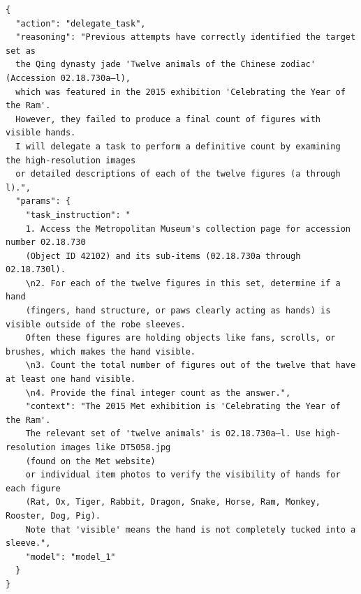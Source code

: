 \begin{tcolorbox}[
  title={\textbf{\small Attempt 5 - Main Decision}},
  boxrule=1pt,
  arc=0mm,
  colback=gray!5,
  colframe=gray!70,
  breakable,
  before skip=10pt,
  after skip=10pt,
  pad at break=2mm,
  parbox=false
]
\begin{verbatim}
{
  "action": "delegate_task",
  "reasoning": "Previous attempts have correctly identified the target set as 
  the Qing dynasty jade 'Twelve animals of the Chinese zodiac' (Accession 02.18.730a–l), 
  which was featured in the 2015 exhibition 'Celebrating the Year of the Ram'. 
  However, they failed to produce a final count of figures with visible hands. 
  I will delegate a task to perform a definitive count by examining the high-resolution images 
  or detailed descriptions of each of the twelve figures (a through l).",
  "params": {
    "task_instruction": "
    1. Access the Metropolitan Museum's collection page for accession number 02.18.730 
    (Object ID 42102) and its sub-items (02.18.730a through 02.18.730l).
    \n2. For each of the twelve figures in this set, determine if a hand 
    (fingers, hand structure, or paws clearly acting as hands) is visible outside of the robe sleeves.
    Often these figures are holding objects like fans, scrolls, or brushes, which makes the hand visible.
    \n3. Count the total number of figures out of the twelve that have at least one hand visible.
    \n4. Provide the final integer count as the answer.",
    "context": "The 2015 Met exhibition is 'Celebrating the Year of the Ram'. 
    The relevant set of 'twelve animals' is 02.18.730a–l. Use high-resolution images like DT5058.jpg 
    (found on the Met website) 
    or individual item photos to verify the visibility of hands for each figure 
    (Rat, Ox, Tiger, Rabbit, Dragon, Snake, Horse, Ram, Monkey, Rooster, Dog, Pig).
    Note that 'visible' means the hand is not completely tucked into a sleeve.",
    "model": "model_1"
  }
}
\end{verbatim}
\end{tcolorbox}


